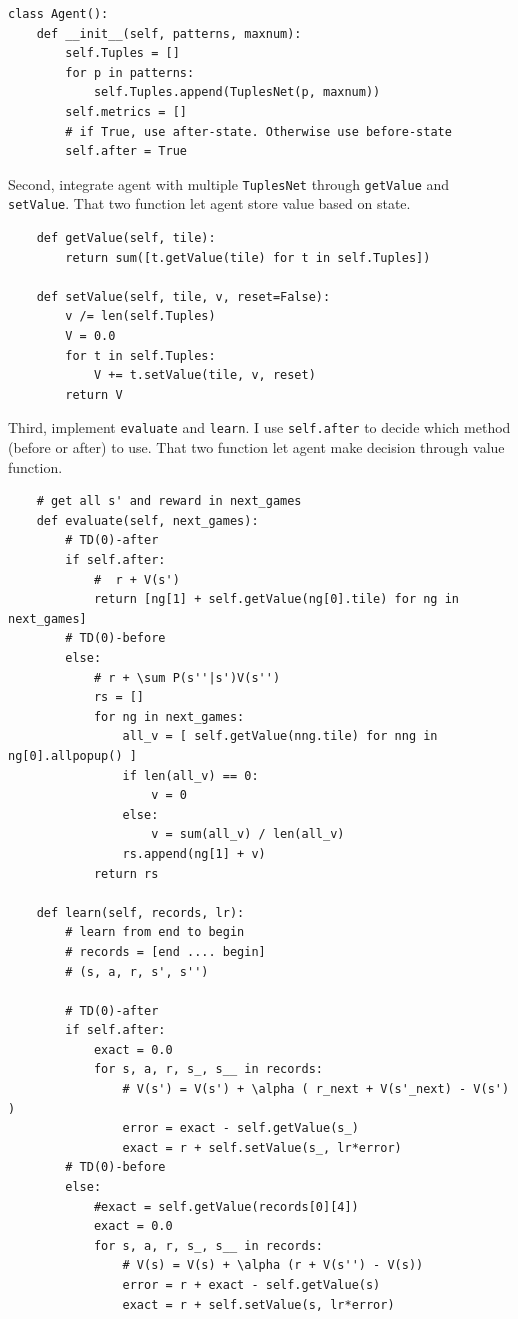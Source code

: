 \documentclass[12pt]{article}
\begin{document}
\begin{verbatim}
class Agent():
    def __init__(self, patterns, maxnum):
        self.Tuples = []
        for p in patterns:
            self.Tuples.append(TuplesNet(p, maxnum))
        self.metrics = []
        # if True, use after-state. Otherwise use before-state
        self.after = True
\end{verbatim}

Second, integrate agent with multiple \verb|TuplesNet| through \verb|getValue| and \verb|setValue|. That two function let agent store value based on state.

\begin{verbatim}
    def getValue(self, tile):
        return sum([t.getValue(tile) for t in self.Tuples])
    
    def setValue(self, tile, v, reset=False):
        v /= len(self.Tuples)
        V = 0.0
        for t in self.Tuples:
            V += t.setValue(tile, v, reset)
        return V
\end{verbatim}

Third, implement \verb|evaluate| and \verb|learn|. I use \verb|self.after| to decide which method (before or after) to use. That two function let agent make decision through value function.

\begin{verbatim}
    # get all s' and reward in next_games
    def evaluate(self, next_games):
        # TD(0)-after
        if self.after:    
            #  r + V(s')
            return [ng[1] + self.getValue(ng[0].tile) for ng in next_games]
        # TD(0)-before
        else:
            # r + \sum P(s''|s')V(s'')
            rs = []
            for ng in next_games:
                all_v = [ self.getValue(nng.tile) for nng in ng[0].allpopup() ]
                if len(all_v) == 0:
                    v = 0
                else:
                    v = sum(all_v) / len(all_v)
                rs.append(ng[1] + v)
            return rs
    
    def learn(self, records, lr):
        # learn from end to begin
        # records = [end .... begin]
        # (s, a, r, s', s'')
        
        # TD(0)-after
        if self.after:
            exact = 0.0
            for s, a, r, s_, s__ in records: 
                # V(s') = V(s') + \alpha ( r_next + V(s'_next) - V(s') )
                error = exact - self.getValue(s_)
                exact = r + self.setValue(s_, lr*error)
        # TD(0)-before
        else:
            #exact = self.getValue(records[0][4])
            exact = 0.0
            for s, a, r, s_, s__ in records:
                # V(s) = V(s) + \alpha (r + V(s'') - V(s))
                error = r + exact - self.getValue(s)
                exact = r + self.setValue(s, lr*error)
\end{verbatim}
\end{document}
